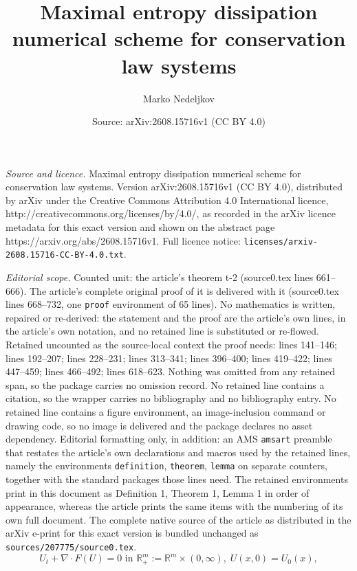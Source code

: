 \documentclass[10pt,a4paper]{amsart}
\title{Maximal entropy dissipation numerical scheme for conservation law systems}
\author{Marko Nedeljkov}
\date{Source: arXiv:2608.15716v1 (CC BY 4.0)}
\begin{document}
\maketitle

\noindent\emph{Source and licence.} Maximal entropy dissipation numerical scheme for conservation law systems. Version arXiv:2608.15716v1 (CC BY 4.0), distributed by arXiv under the Creative Commons Attribution 4.0 International licence, http://creativecommons.org/licenses/by/4.0/, as recorded in the arXiv licence metadata for this exact version and shown on the abstract page https://arxiv.org/abs/2608.15716v1. Full licence notice: \texttt{licenses/arxiv-2608.15716-CC-BY-4.0.txt}.\par\smallskip

\noindent\textit{Editorial scope.} Counted unit: the article's theorem t-2 (source0.tex lines 661--666). The article's complete original proof of it is delivered with it (source0.tex lines 668--732, one \texttt{proof} environment of 65 lines). No mathematics is written, repaired or re-derived: the statement and the proof are the article's own lines, in the article's own notation, and no retained line is substituted or re-flowed.  Retained uncounted as the source-local context the proof needs: lines 141--146; lines 192--207; lines 228--231; lines 313--341; lines 396--400; lines 419--422; lines 447--459; lines 466--492; lines 618--623.  Nothing was omitted from any retained span, so the package carries no omission record.  No retained line contains a citation, so the wrapper carries no bibliography and no bibliography entry.  No retained line contains a figure environment, an image-inclusion command or drawing code, so no image is delivered and the package declares no asset dependency.  Editorial formatting only, in addition: an AMS \texttt{amsart} preamble that restates the article's own declarations and macros used by the retained lines, namely the environments \texttt{definition}, \texttt{theorem}, \texttt{lemma} on separate counters, together with the standard packages those lines need.  The retained environments print in this document as Definition 1, Theorem 1, Lemma 1 in order of appearance, whereas the article prints the same items with the numbering of its own full document.  The complete native source of the article as distributed in the arXiv e-print for this exact version is bundled unchanged as \texttt{sources/207775/source0.tex}.
\begin{equation} \label{claws}
U_{t}+\nabla \cdot F(U) = 0 \text{ in } \mathbb{R}_{+}^{m}:=\mathbb{R} ^{m}
\times  (0,\infty ), \;  U(x,0)=U_{0}(x), 
\end{equation}
\end{document}
